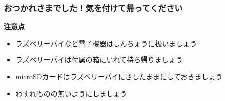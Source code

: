 \documentclass[dvipdfmx]{beamer}
\begin{document}
\begin{frame}[fragile]
	\frametitle{おつかれさまでした！気を付けて帰ってください~~~}
     \large\textbf{注意点}
        \begin{itemize}
          \item ラズベリーパイなど電子機器はしんちょうに扱いましょう
          \bigskip
          \item ラズベリーパイは付属の箱にいれて持ち帰りましょう
          \bigskip
          \item microSDカードはラズベリーパイにさしたままにしておきましょう
          \bigskip
          \item わすれものの無いようにしましょう
        \end{itemize}
\end{frame}


\end{document}
